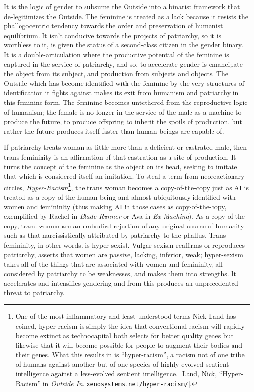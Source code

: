 \documentclass[10pt, statementpaper, twoside, openright]{memoir}
\begin{document}
It is the logic of gender to subsume the Outside into a binarist framework that de-legitimizes the Outside. The feminine is treated as a lack because it resists the phallogocentric tendency towards the order and preservation of humanist equilibrium. It isn't conducive towards the projects of patriarchy, so it is worthless to it, is given the status of a second-class citizen in the gender binary. It is a double-articulation where the productive potential of the feminine is captured in the service of patriarchy, and so, to accelerate gender is emancipate the object from its subject, and production from subjects and objects. The Outside which has become identified with the feminine by the very structures of identification it fights against makes its exit from humanism and patriarchy in this feminine form. The feminine becomes untethered from the reproductive logic of humanism; the female is no longer in the service of the male as a machine to produce the future, to produce offspring to inherit the spoils of production, but rather the future produces itself faster than human beings are capable of.

If patriarchy treats woman as little more than a deficient or castrated male, then trans femininity is an affirmation of that castration as a site of production. It turns the concept of the feminine as the object on its head, seeking to imitate that which is considered itself an imitation. To steal a term from neoreactionary circles, \textit{Hyper-Racism}\footnote{One of the most inflammatory and least-understood terms Nick Land has coined, hyper-racism is simply the idea that conventional racism will rapidly become extinct as technocapital both selects for better quality genes but likewise that it will become possible for people to augment their bodies and their genes. What this results in is “hyper-racism”, a racism not of one tribe of humans against another but of one species of highly-evolved sentient intelligence against a less-evolved sentient intelligence. [Land, Nick, ``Hyper-Racism'' in \textit{Outside In}. \href{http://www.xenosystems.net/hyper-racism/}{\nolinkurl{xenosystems.net/hyper-racism/}}].}, the trans woman becomes a copy-of-the-copy just as AI is treated as a copy of the human being and almost ubiquitously identified with women and femininity (thus making AI in those cases as copy-of-the-copy, exemplified by Rachel in \textit{Blade Runner} or Ava in \textit{Ex Machina}). As a copy-of-the-copy, trans women are an embodied rejection of any original source of humanity such as that narcissistically attributed by patriarchy to the phallus. Trans femininity, in other words, is hyper-sexist. Vulgar sexism reaffirms or reproduces patriarchy, asserts that women are passive, lacking, inferior, weak; hyper-sexism takes all of the things that are associated with women and femininity, all considered by patriarchy to be weaknesses, and makes them into strengths. It accelerates and intensifies gendering and from this produces an unprecedented threat to patriarchy.
\end{document}

